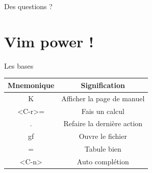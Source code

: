 \documentclass[10pt]{beamer}
\begin{document}
	\begin{frame}[standout]
		Des questions ?
	\end{frame}

\section{Vim power !}
	\begin{frame}{Les bases}
		\center
		\begin{tabular}{|c|c|}
			\hline
			\textbf{Mnemonique} & \textbf{Signification} \\ 
			\hline
			\hline
			K & Afficher la page de manuel \\ 
			\hline
			<C-r>= & Fais un calcul\\ 
			\hline
			. & Refaire la dernière action\\ 
			\hline
			gf & Ouvre le fichier\\ 
			\hline
			= & Tabule bien\\ 
			\hline
			<C-n> & Auto complétion\\ 
			\hline
		\end{tabular}\\
		\vspace{5pt}
		
		\\
		
	\end{frame}
\end{document}
